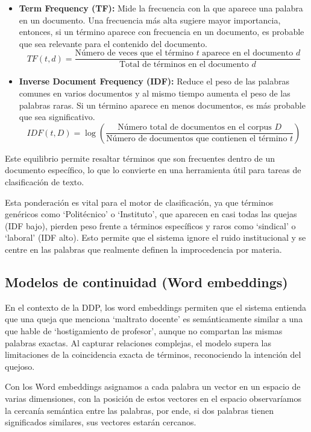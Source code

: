 \begin{itemize}
\item \textbf{Term Frequency (TF):} Mide la frecuencia con la que aparece una palabra en un documento. Una frecuencia más alta sugiere mayor importancia, entonces, si un término aparece con frecuencia en un documento, es probable que sea relevante para el contenido del documento.
\begin{equation}
TF(t,d) = \frac{\text{Número de veces que el término } t \text{ aparece en el documento } d}{\text{Total de términos en el documento } d}
\end{equation}
\item \textbf{Inverse Document Frequency (IDF):} Reduce el peso de las palabras comunes en varios documentos y al mismo tiempo aumenta el peso de las palabras raras. Si un término aparece en menos documentos, es más probable que sea significativo.
\begin{equation}
IDF(t, D) = \log\left(\frac{\text{Número total de documentos en el corpus } D}{\text{Número de documentos que contienen el término } t}\right)
\end{equation}
\end{itemize}
Este equilibrio permite resaltar términos que son frecuentes dentro de un documento específico, lo que lo convierte en una herramienta útil para tareas de clasificación de texto.

Esta ponderación es vital para el motor de clasificación, ya que términos genéricos como ‘Politécnico’ o ‘Instituto’, que aparecen en casi todas las quejas (IDF bajo), pierden peso frente a términos específicos y raros como ‘sindical’ o ‘laboral’ (IDF alto). Esto permite que el sistema ignore el ruido institucional y se centre en las palabras que realmente definen la improcedencia por materia.

\subsection{Modelos de continuidad (Word embeddings)}

En el contexto de la DDP, los word embeddings permiten que el sistema entienda que una queja que menciona ‘maltrato docente’ es semánticamente similar a una que hable de ‘hostigamiento de profesor’, aunque no compartan las mismas palabras exactas. Al capturar relaciones complejas, el modelo supera las limitaciones de la coincidencia exacta de términos, reconociendo la intención del quejoso.

Con los Word embeddings asignamos a cada palabra un vector en un espacio de varias dimensiones, con la posición de estos vectores en el espacio observaríamos la cercanía semántica entre las palabras, por ende, si dos palabras tienen significados similares, sus vectores estarán cercanos.

